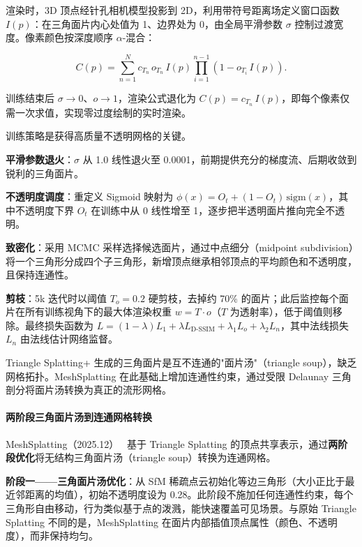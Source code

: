 渲染时，3D 顶点经针孔相机模型投影到 2D，利用带符号距离场定义窗口函数 $I(p)$：在三角面片内心处值为 1、边界处为 0，由全局平滑参数 $\sigma$ 控制过渡宽度。像素颜色按深度顺序 $\alpha$-混合：

\begin{equation*}
C(p) = \sum_{n=1}^{N} c_{T_n}\, o_{T_n}\, I(p) \prod_{i=1}^{n-1}(1-o_{T_i}\, I(p)).
\end{equation*}

训练结束后 $\sigma \to 0$、$o \to 1$，渲染公式退化为 $C(p) = c_{T_n}\, I(p)$，即每个像素仅需一次求值，实现零过度绘制的实时渲染。

训练策略是获得高质量不透明网格的关键。

\textbf{平滑参数退火}：$\sigma$ 从 1.0 线性退火至 0.0001，前期提供充分的梯度流、后期收敛到锐利的三角面片。

\textbf{不透明度调度}：重定义 Sigmoid 映射为 $\phi(x) = O_t + (1-O_t)\,\text{sigm}(x)$，其中不透明度下界 $O_t$ 在训练中从 0 线性增至 1，逐步把半透明面片推向完全不透明。

\textbf{致密化}：采用 MCMC 采样选择候选面片，通过中点细分（midpoint subdivision）将一个三角形分成四个子三角形，新增顶点继承相邻顶点的平均颜色和不透明度，且保持连通性。

\textbf{剪枝}：5k 迭代时以阈值 $T_o=0.2$ 硬剪枝，去掉约 70\% 的面片；此后监控每个面片在所有训练视角下的最大体渲染权重 $w = T \cdot o$（$T$ 为透射率），低于阈值则移除。最终损失函数为 $L = (1-\lambda)L_1 + \lambda L_{\text{D-SSIM}} + \lambda_1 L_o + \lambda_2 L_n$，其中法线损失 $L_n$ 由法线估计网络监督。

Triangle Splatting+ 生成的三角面片是互不连通的"面片汤"（triangle soup），缺乏网格拓扑。MeshSplatting 在此基础上增加连通性约束，通过受限 Delaunay 三角剖分将面片汤转换为真正的流形网格。

\paragraph{两阶段三角面片汤到连通网格转换}

MeshSplatting（2025.12）~\cite{2512_06818} 基于 Triangle Splatting 的顶点共享表示，通过\textbf{两阶段优化}将无结构三角面片汤（triangle soup）转换为连通网格。

\textbf{阶段一——三角面片汤优化}：从 SfM 稀疏点云初始化等边三角形（大小正比于最近邻距离的均值），初始不透明度设为 0.28。此阶段不施加任何连通性约束，每个三角形自由移动，行为类似基于点的泼溅，能快速覆盖可见场景。与原始 Triangle Splatting 不同的是，MeshSplatting 在面片内部插值顶点属性（颜色、不透明度），而非保持均匀。

